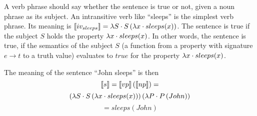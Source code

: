 A verb phrase should say whether the sentence is true or not, given a noun phrase as its subject. An intransitive verb like ``sleeps'' is the simplest verb phrase. Its meaning is $\llbracket iv_{sleeps} \rrbracket = \lambda S \cdot S \left( \lambda x \cdot sleeps(x) \right)$. The sentence is true if the subject $S$ holds the property $\lambda x \cdot sleeps(x)$. In other words, the sentence is true, if the semantics of the subject $S$ (a function from a property with signature $e \to t$ to a truth value) evaluates to $true$ for the property $\lambda x \cdot sleeps(x)$.

The meaning of the sentence ``John sleeps'' is then $$\llbracket s \rrbracket = \llbracket vp \rrbracket \left( \llbracket np \rrbracket \right) =$$$$ \left( \lambda S \cdot S \left( \lambda x \cdot sleeps(x) \right) \right) \left( \lambda P \cdot P \left( John \right) \right)$$$$= sleeps(John)$$


